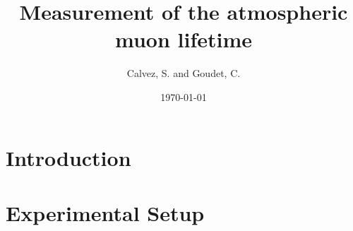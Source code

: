 \documentclass[final,twoside,twocolumn,10pt]{article}
\begin{document}
%
\title{Measurement of the atmospheric muon lifetime}
\author{Calvez, S. and Goudet, C.}
%
\date{\today}

\maketitle
%
\begin{abstract}

\end{abstract}

\section{Introduction}


\section{Experimental Setup}
\end{document}
